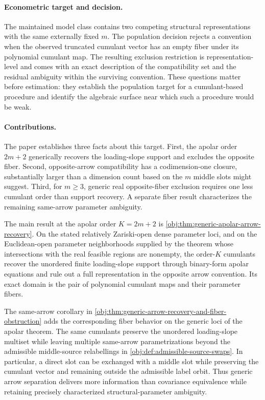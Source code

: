 \documentclass[11pt]{article}
\begin{document}
\paragraph{Econometric target and decision.}
The maintained model class contains two competing structural representations with the same externally fixed \(m\). The population decision rejects a convention when the observed truncated cumulant vector has an empty fiber under its polynomial cumulant map. The resulting exclusion restriction is representation-level and comes with an exact description of the compatibility set and the residual ambiguity within the surviving convention. These questions matter before estimation: they establish the population target for a cumulant-based procedure and identify the algebraic surface near which such a procedure would be weak.

\paragraph{Contributions.}
The paper establishes three facts about this target. First, the apolar order \(2m+2\) generically recovers the loading-slope support and excludes the opposite fiber. Second, opposite-arrow compatibility has a codimension-one closure, substantially larger than a dimension count based on the \(m\) middle slots might suggest. Third, for \(m\ge3\), generic real opposite-fiber exclusion requires one less cumulant order than support recovery. A separate fiber result characterizes the remaining same-arrow parameter ambiguity.

The main result at the apolar order \(K=2m+2\) is \cref{obj:thm:generic-apolar-arrow-recovery}. On the stated relatively Zariski-open dense parameter loci, and on the Euclidean-open parameter neighborhoods supplied by the theorem whose intersections with the real feasible regions are nonempty, the order-\(K\) cumulants recover the unordered finite loading-slope support through binary-form apolar equations and rule out a full representation in the opposite arrow convention. Its exact domain is the pair of polynomial cumulant maps and their parameter fibers.

The same-arrow corollary in \cref{obj:thm:generic-arrow-recovery-and-fiber-obstruction} adds the corresponding fiber behavior on the generic loci of the apolar theorem. The same cumulants preserve the unordered loading-slope multiset while leaving multiple same-arrow parametrizations beyond the admissible middle-source relabellings in \cref{obj:def:admissible-source-swaps}. In particular, a direct slot can be exchanged with a middle slot while preserving the cumulant vector and remaining outside the admissible label orbit. Thus generic arrow separation delivers more information than covariance equivalence while retaining precisely characterized structural-parameter ambiguity.
\end{document}
